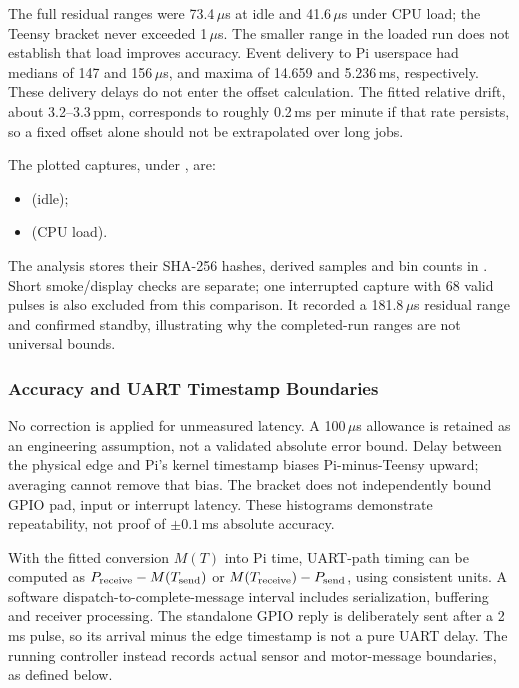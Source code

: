 The full residual ranges were 73.4\,$\mu$s at idle and 41.6\,$\mu$s under CPU load; the Teensy bracket never exceeded 1\,$\mu$s. The smaller range in the loaded run does not establish that load improves accuracy. Event delivery to Pi userspace had medians of 147 and 156\,$\mu$s, and maxima of 14.659 and 5.236\,ms, respectively. These delivery delays do not enter the offset calculation. The fitted relative drift, about 3.2--3.3\,ppm, corresponds to roughly 0.2\,ms per minute if that rate persists, so a fixed offset alone should not be extrapolated over long jobs.

The plotted captures, under , are:
\begin{itemize}
\item {} (idle);
\item {} (CPU load).
\end{itemize}
 The analysis stores their SHA-256 hashes, derived samples and bin counts in . Short smoke/display checks are separate; one interrupted capture with 68 valid pulses is also excluded from this comparison. It recorded a 181.8\,$\mu$s residual range and confirmed standby, illustrating why the completed-run ranges are not universal bounds.

\subsubsection{Accuracy and UART Timestamp Boundaries}
No correction is applied for unmeasured latency. A 100\,$\mu$s allowance is retained as an engineering assumption, not a validated absolute error bound. Delay between the physical edge and Pi's kernel timestamp biases Pi-minus-Teensy upward; averaging cannot remove that bias. The bracket does not independently bound GPIO pad, input or interrupt latency. These histograms demonstrate repeatability, not proof of $\pm0.1$\,ms absolute accuracy.

With the fitted conversion $M(T)$ into Pi time, UART-path timing can be computed as $P_{\rm receive}-M(T_{\rm send})$ or $M(T_{\rm receive})-P_{\rm send}$, using consistent units. A software dispatch-to-complete-message interval includes serialization, buffering and receiver processing. The standalone GPIO reply is deliberately sent after a 2\,ms pulse, so its arrival minus the edge timestamp is not a pure UART delay. The running controller instead records actual sensor and motor-message boundaries, as defined below.

